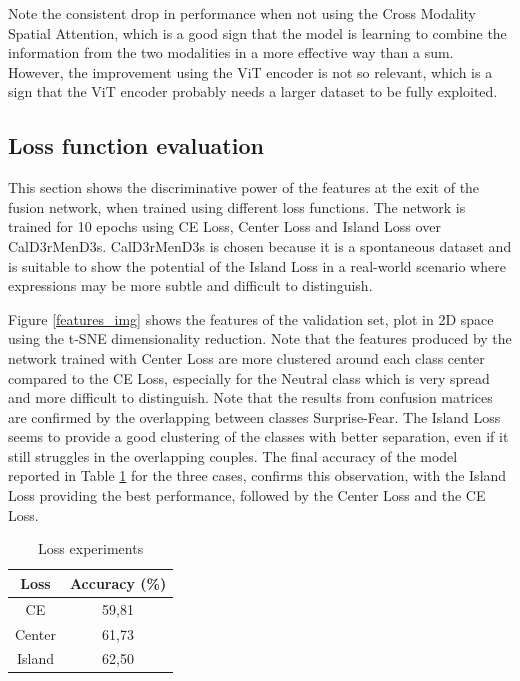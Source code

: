 Note the consistent drop in performance when not using the Cross Modality Spatial Attention, which is a good sign that the model is learning to combine the information from the two modalities in a more effective way than a sum.
However, the improvement using the ViT encoder is not so relevant, which is a sign that the ViT encoder probably needs a larger dataset to be fully exploited. 


\subsection{Loss function evaluation}\label{Loss function analysis}
This section shows the discriminative power of the features at the exit of the fusion network, when trained using different loss functions. The network is trained for 10 epochs using CE Loss, Center Loss and Island Loss over CalD3rMenD3s. CalD3rMenD3s is chosen because it is a spontaneous dataset and is suitable to show the potential of the Island Loss in a real-world scenario where expressions may be more subtle and difficult to distinguish. 

Figure \ref{features_img} shows the features of the validation set, plot in 2D space using the t-SNE dimensionality reduction. Note that the features produced by the network trained with Center Loss are more clustered around each class center compared to the CE Loss, especially for the Neutral class which is very spread and more difficult to distinguish. Note that the results from confusion matrices are confirmed by the overlapping between classes Surprise-Fear. The Island Loss seems to provide a good clustering of the classes with better separation, even if it still struggles in the overlapping couples. The final accuracy of the model reported in Table \ref{loss_acc} for the three cases, confirms this observation, with the Island Loss providing the best performance, followed by the Center Loss and the CE Loss.


\begin{table}[H]
    \centering
    \caption{Loss experiments}
    \begin{tabular}{cc}
    \hline
    Loss & Accuracy (\%)\\
    \hline
    CE & 59,81 \\
    \hline
    Center & 61,73\\
    \hline
    Island & 62,50\\
    \hline
    \end{tabular}
    \label{loss_acc}
\end{table}



